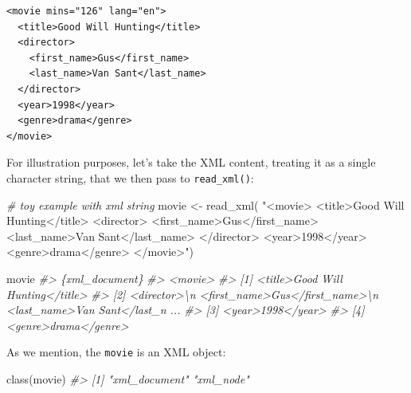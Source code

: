 \documentclass[
]{book}
\newenvironment{Shaded}{\begin{snugshade}}{\end{snugshade}}
\newcommand{\CommentTok}[1]{\textcolor[rgb]{0.56,0.35,0.01}{\textit{#1}}}
\newcommand{\FunctionTok}[1]{\textcolor[rgb]{0.00,0.00,0.00}{#1}}
\newcommand{\NormalTok}[1]{#1}
\newcommand{\OtherTok}[1]{\textcolor[rgb]{0.56,0.35,0.01}{#1}}
\newcommand{\StringTok}[1]{\textcolor[rgb]{0.31,0.60,0.02}{#1}}
\begin{document}
\begin{verbatim}
<movie mins="126" lang="en">
  <title>Good Will Hunting</title>
  <director>
    <first_name>Gus</first_name>
    <last_name>Van Sant</last_name>
  </director>
  <year>1998</year>
  <genre>drama</genre>
</movie>
\end{verbatim}

For illustration purposes, let's take the XML content, treating it as a single
character string, that we then pass to \texttt{read\_xml()}:

\begin{Shaded}
\begin{Highlighting}[]
\CommentTok{\# toy example with xml string}
\NormalTok{movie }\OtherTok{\textless{}{-}} \FunctionTok{read\_xml}\NormalTok{(}
\StringTok{"\textless{}movie\textgreater{}}
\StringTok{\textless{}title\textgreater{}Good Will Hunting\textless{}/title\textgreater{}}
\StringTok{\textless{}director\textgreater{}}
\StringTok{\textless{}first\_name\textgreater{}Gus\textless{}/first\_name\textgreater{}}
\StringTok{\textless{}last\_name\textgreater{}Van Sant\textless{}/last\_name\textgreater{}}
\StringTok{\textless{}/director\textgreater{}}
\StringTok{\textless{}year\textgreater{}1998\textless{}/year\textgreater{}}
\StringTok{\textless{}genre\textgreater{}drama\textless{}/genre\textgreater{}}
\StringTok{\textless{}/movie\textgreater{}"}\NormalTok{)}

\NormalTok{movie}
\CommentTok{\#\textgreater{} \{xml\_document\}}
\CommentTok{\#\textgreater{} \textless{}movie\textgreater{}}
\CommentTok{\#\textgreater{} [1] \textless{}title\textgreater{}Good Will Hunting\textless{}/title\textgreater{}}
\CommentTok{\#\textgreater{} [2] \textless{}director\textgreater{}\textbackslash{}n  \textless{}first\_name\textgreater{}Gus\textless{}/first\_name\textgreater{}\textbackslash{}n  \textless{}last\_name\textgreater{}Van Sant\textless{}/last\_n ...}
\CommentTok{\#\textgreater{} [3] \textless{}year\textgreater{}1998\textless{}/year\textgreater{}}
\CommentTok{\#\textgreater{} [4] \textless{}genre\textgreater{}drama\textless{}/genre\textgreater{}}
\end{Highlighting}
\end{Shaded}

As we mention, the \texttt{movie} is an XML object:

\begin{Shaded}
\begin{Highlighting}[]
\FunctionTok{class}\NormalTok{(movie)}
\CommentTok{\#\textgreater{} [1] "xml\_document" "xml\_node"}
\end{Highlighting}
\end{Shaded}
\end{document}
